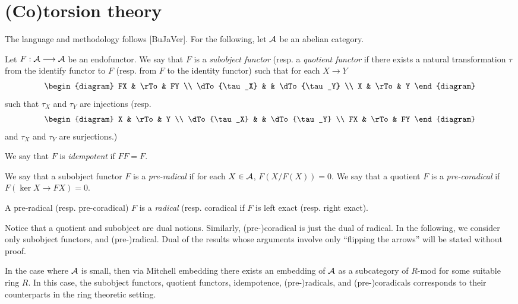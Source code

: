 \section{(Co)torsion theory}

The language and methodology follows [BuJaVer]. For the 
following, let $\mathcal{A}$ be an abelian category.

\begin{definition}
Let $F: \mathcal{A} \longrightarrow \mathcal{A}$ be an endofunctor. We say that
$F$ is a \emph{subobject functor} (resp. a \emph{quotient functor}
if there exists a natural transformation $\tau$ from the identify
functor to $F$ (resp. from $F$ to the identity functor) such that 
for each $X \to Y$
\[
\begin{diagram}
FX           & \rTo & FY           \\
\dTo{\tau_X} &      & \dTo{\tau_Y} \\
X            & \rTo & Y
\end{diagram}
\]
such that $\tau_X$ and $\tau_Y$ are injections (resp. 
\[
\begin{diagram}
X            & \rTo & Y            \\
\dTo{\tau_X} &      & \dTo{\tau_Y} \\
FX           & \rTo & FY
\end{diagram}
\]
and $\tau_X$ and $\tau_Y$ are surjections.)
\end{definition}

\begin{definition}
We say that $F$ is \emph{idempotent} if $FF = F$.
\end{definition}

\begin{definition}
We say that a subobject functor $F$ is a \emph{pre-radical} 
if for each $X \in \mathcal{A}$, $F(X/F(X)) = 0$. We say that a 
quotient $F$ is a \emph{pre-coradical} if $F(\ker X \to FX) = 0$.
\end{definition}

\begin{definition}
A pre-radical (resp. pre-coradical) $F$ is a \emph{radical} (resp. 
coradical if $F$ is left exact (resp. right exact).
\end{definition}

\begin{rmk}
Notice that a quotient and subobject are dual notions. Similarly,
(pre-)coradical is just the dual of radical. In the following, we
consider only subobject functors, and (pre-)radical. Dual of the 
results whose arguments involve only ``flipping the arrows'' will
be stated without proof.
\end{rmk}

\begin{rmk}
In the case where $\mathcal{A}$ is small, then via Mitchell embedding
there exists an embedding of $\mathcal{A}$ as a subcategory of $R$-mod
for some suitable ring $R$. In this case, the subobject functors, 
quotient functors, idempotence, (pre-)radicals, and (pre-)coradicals
corresponds to their counterparts in the ring theoretic setting.
\end{rmk}

\begin{prop}

\end{prop}
